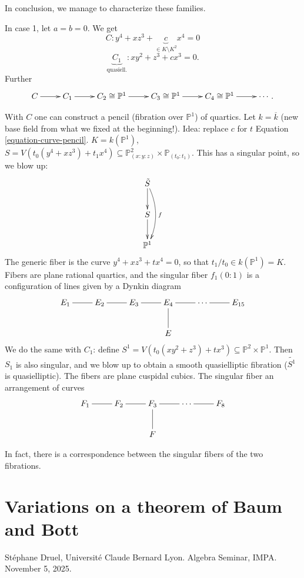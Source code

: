 \noindent
In conclusion, we manage to characterize
these families.

\begin{example}
\label{example-chain-of-maps}
In case 1, let $a=b=0$. We get
\begin{equation}
\label{equation-curve-pencil}
C: y^4+xz^3+\underbrace{c}_{\in K\setminus
K^2}x^4=0
\end{equation}
$$
\underbrace{C_1}_{\text{quasiell.}}:xy^2+z^3+
cx^3=0.
$$
Further
$$
\xymatrix{
C\ar[r]&C_1\ar[r]&C_2 \cong\mathbb{P}^1\ar[r]
&C_3 \cong \mathbb{P}^1\ar[r]&C_4\cong
\mathbb{P}^1\ar[r]&\cdots.
}
$$
\end{example}

\medskip\noindent
With $C$ one can construct a pencil
(fibration over $\mathbb{P}^1$)
of quartics.
Let $k=\overline{k}$ (new base field from
what we fixed at the beginning!).
Idea: replace $c$ for $t$ Equation
\ref{equation-curve-pencil}.
 $K=k(\mathbb{P}^1)$,
 $S=V(t_0(y^4+xz^3)+t_1x^4)
\subseteq \mathbb{P}^2_{(x:y:z)}\times
\mathbb{P}_{(t_0:t_1)}$.
This has a singular point, so we blow up:
$$
\xymatrix{
\tilde{S}\ar[d]\ar@/^1em/[dd]^f\\
S\ar[d]\\\mathbb{P}^1
}
$$
The generic fiber is the curve
$y^4+xz^3+tx^4=0$,
so that $t_1/t_0 \in k(\mathbb{P}^1)=K$.
Fibers are plane rational quartics,
and the singular fiber $f_1(0:1)$ is a
configuration of lines
given by a Dynkin diagram
$$
\xymatrix{
E_1 \ar@{-}[r]& E_2\ar@{-}[r]
& E_3 \ar@{-}[r]& E_4\ar@{-}[d]\ar@{-}[r]
& \cdots \ar@{-}[r]& E_{15}\\
& & & E
}
$$
We do the same with $C_1$: define
$S^1=V(t_0(xy^2+z^3)+tx^3) \subseteq
\mathbb{P}^2 \times \mathbb{P}^1$.
Then $S_1$ is also singular, and we blow up
to obtain a smooth
quasielliptic fibration ($\tilde{S^1}$ is
quasielliptic).
The fibers are plane cuspidal cubics.
The singular fiber an arrangement of curves
$$
\xymatrix{
F_1 \ar@{-}[r]& F_2\ar@{-}[r]&
F_3\ar@{-}[d]\ar@{-}[r]& \cdots \ar@{-}[r]&
F_8\\
& & F
}
$$

In fact, there is a correspondence between
the
singular fibers of the two fibrations.

\section{Variations on a theorem of Baum and
Bott}
\label{section-baum-and-bott}

\noindent
Stéphane Druel, Université Claude Bernard
Lyon.
Algebra Seminar, IMPA.
November 5, 2025.

